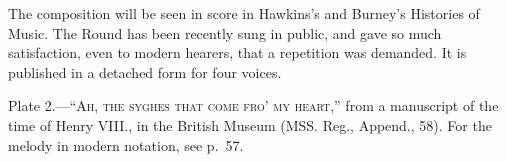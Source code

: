 The composition will be seen in score in Hawkins’s and Burney’s Histories of
Music. The Round has been recently sung in public, and gave so much satisfaction,
even to modern hearers, that a repetition was demanded. It is published in a detached
form for four voices.

\bigskip
Plate 2.—“\textsc{Ah, the syghes that come fro’ my heart},” from a manu\-script of
the time of Henry VIII., in the British Museum (MSS. Reg., Append., 58). For
the melody in modern notation, see p.~57. 
\pagebreak